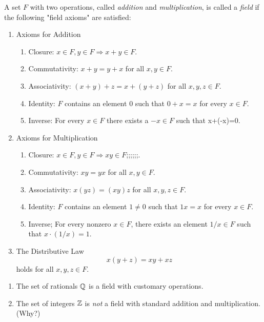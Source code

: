 \documentclass{article}
\begin{document}
\begin{definition}
    A set $F$ with two operations, called \emph{addition} and \emph{multiplication}, is called a \emph{field} if the following "field axioms" are satisfied:
    \begin{enumerate}
        \item Axioms for Addition
        \begin{enumerate}
            \item Closure: $x\in F, y\in F\Rightarrow x+y\in F$.
            \item Commutativity: $x+y=y+x$ for all $x,y\in F$.
            \item Associativity: $(x+y)+z=x+(y+z)$ for all $x,y,z\in F$.
            \item Identity: $F$ contains an element $0$ such that $0+x=x$ for every $x\in F$.
            \item Inverse: For every $x\in F$ there exists a $-x\in F$ such that x+(-x)=0.
        \end{enumerate}
        \item Axioms for Multiplication
        \begin{enumerate}
            \item Closure: $x\in F, y\in F\Rightarrow xy\in F$;;;;;;.
            \item Commutativity: $xy=yx$ for all $x,y\in F$.
            \item Associativity: $x(yz)=(xy)z$ for all $x,y,z\in F$.
            \item Identity: $F$ contains an element $1\neq 0$ such that $1x=x$ for every $x\in F$.
            \item Inverse; For every nonzero $x\in F$, there exists an element $1/x\in F$ such that $x\cdot(1/x)=1$.
        \end{enumerate}
        \item The Distributive Law
        \[x(y+z)=xy+xz\]holds for all $x,y,z\in F$.
    \end{enumerate}
\end{definition}
\begin{example}[Fields]
    \listhack 
    \begin{enumerate}
        \item The set of rationals $\mathbb Q$ is a field with customary operations.
        \item The set of integers $\mathbb Z$ is \emph{not} a field with standard addition and multiplication. (Why?)
    \end{enumerate}
\end{example}
\end{document}
